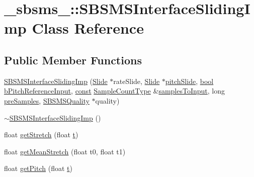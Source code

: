 \hypertarget{class__sbsms___1_1_s_b_s_m_s_interface_sliding_imp}{}\section{\+\_\+sbsms\+\_\+\+:\+:S\+B\+S\+M\+S\+Interface\+Sliding\+Imp Class Reference}
\label{class__sbsms___1_1_s_b_s_m_s_interface_sliding_imp}
\subsection*{Public Member Functions}
\begin{DoxyCompactItemize}
\item 
\hyperlink{class__sbsms___1_1_s_b_s_m_s_interface_sliding_imp_a076175ec17847524175b9ed8d4336024}{S\+B\+S\+M\+S\+Interface\+Sliding\+Imp} (\hyperlink{class__sbsms___1_1_slide}{Slide} $\ast$rate\+Slide, \hyperlink{class__sbsms___1_1_slide}{Slide} $\ast$\hyperlink{class__sbsms___1_1_s_b_s_m_s_interface_sliding_imp_a050fad0731035f64dd21d88344e9c1cb}{pitch\+Slide}, \hyperlink{mac_2config_2i386_2lib-src_2libsoxr_2soxr-config_8h_abb452686968e48b67397da5f97445f5b}{bool} \hyperlink{class__sbsms___1_1_s_b_s_m_s_interface_sliding_imp_a7c916bf73455a6a8a62cb7a4a85991bc}{b\+Pitch\+Reference\+Input}, \hyperlink{getopt1_8c_a2c212835823e3c54a8ab6d95c652660e}{const} \hyperlink{namespace__sbsms___ae4ba47977e7e07f5945e529e2256b662}{Sample\+Count\+Type} \&\hyperlink{class__sbsms___1_1_s_b_s_m_s_interface_sliding_imp_a9569618090c12bac71eed9bcfd83c0ed}{samples\+To\+Input}, long \hyperlink{class__sbsms___1_1_s_b_s_m_s_interface_sliding_imp_a228d094878d1d16d4fe884bf42e7385c}{pre\+Samples}, \hyperlink{class__sbsms___1_1_s_b_s_m_s_quality}{S\+B\+S\+M\+S\+Quality} $\ast$quality)
\item 
\hyperlink{class__sbsms___1_1_s_b_s_m_s_interface_sliding_imp_a75aea9bf8a22c166dd8dcaa3ea59dddf}{$\sim$\+S\+B\+S\+M\+S\+Interface\+Sliding\+Imp} ()
\item 
float \hyperlink{class__sbsms___1_1_s_b_s_m_s_interface_sliding_imp_a09d01fe6f01c29def476b00e02eaca85}{get\+Stretch} (float \hyperlink{octave__test_8m_aaccc9105df5383111407fd5b41255e23}{t})
\item 
float \hyperlink{class__sbsms___1_1_s_b_s_m_s_interface_sliding_imp_adf2acd27b595fb069bea1a300fe147f5}{get\+Mean\+Stretch} (float t0, float t1)
\item 
float \hyperlink{class__sbsms___1_1_s_b_s_m_s_interface_sliding_imp_a89a9ed0c3b376fefb6d471a1db87fac4}{get\+Pitch} (float \hyperlink{octave__test_8m_aaccc9105df5383111407fd5b41255e23}{t})

\end{DoxyCompactItemize}
